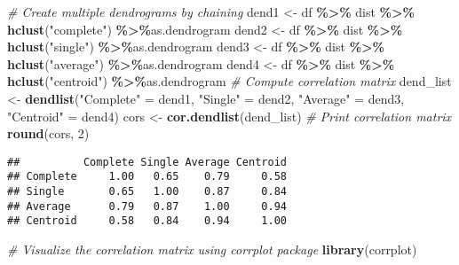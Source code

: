 \documentclass[
]{elegantbook}
\newenvironment{Shaded}{\begin{snugshade}}{\end{snugshade}}
\newcommand{\CommentTok}[1]{\textcolor[rgb]{0.56,0.35,0.01}{\textit{#1}}}
\newcommand{\DecValTok}[1]{\textcolor[rgb]{0.00,0.00,0.81}{#1}}
\newcommand{\FunctionTok}[1]{\textcolor[rgb]{0.13,0.29,0.53}{\textbf{#1}}}
\newcommand{\NormalTok}[1]{#1}
\newcommand{\OtherTok}[1]{\textcolor[rgb]{0.56,0.35,0.01}{#1}}
\newcommand{\SpecialCharTok}[1]{\textcolor[rgb]{0.81,0.36,0.00}{\textbf{#1}}}
\newcommand{\StringTok}[1]{\textcolor[rgb]{0.31,0.60,0.02}{#1}}
\begin{document}
\begin{Shaded}
\begin{Highlighting}[]
\CommentTok{\# Create multiple dendrograms by chaining}
\NormalTok{dend1 }\OtherTok{\textless{}{-}}\NormalTok{ df }\SpecialCharTok{\%\textgreater{}\%}\NormalTok{ dist }\SpecialCharTok{\%\textgreater{}\%} \FunctionTok{hclust}\NormalTok{(}\StringTok{"complete"}\NormalTok{) }\SpecialCharTok{\%\textgreater{}\%}\NormalTok{as.dendrogram}
\NormalTok{dend2 }\OtherTok{\textless{}{-}}\NormalTok{ df }\SpecialCharTok{\%\textgreater{}\%}\NormalTok{ dist }\SpecialCharTok{\%\textgreater{}\%} \FunctionTok{hclust}\NormalTok{(}\StringTok{"single"}\NormalTok{) }\SpecialCharTok{\%\textgreater{}\%}\NormalTok{as.dendrogram}
\NormalTok{dend3 }\OtherTok{\textless{}{-}}\NormalTok{ df }\SpecialCharTok{\%\textgreater{}\%}\NormalTok{ dist }\SpecialCharTok{\%\textgreater{}\%} \FunctionTok{hclust}\NormalTok{(}\StringTok{"average"}\NormalTok{) }\SpecialCharTok{\%\textgreater{}\%}\NormalTok{as.dendrogram}
\NormalTok{dend4 }\OtherTok{\textless{}{-}}\NormalTok{ df }\SpecialCharTok{\%\textgreater{}\%}\NormalTok{ dist }\SpecialCharTok{\%\textgreater{}\%} \FunctionTok{hclust}\NormalTok{(}\StringTok{"centroid"}\NormalTok{) }\SpecialCharTok{\%\textgreater{}\%}\NormalTok{as.dendrogram}
\CommentTok{\# Compute correlation matrix}
\NormalTok{dend\_list }\OtherTok{\textless{}{-}} \FunctionTok{dendlist}\NormalTok{(}\StringTok{"Complete"} \OtherTok{=}\NormalTok{ dend1, }\StringTok{"Single"} \OtherTok{=}\NormalTok{ dend2,}
\StringTok{"Average"} \OtherTok{=}\NormalTok{ dend3, }\StringTok{"Centroid"} \OtherTok{=}\NormalTok{ dend4)}
\NormalTok{cors }\OtherTok{\textless{}{-}} \FunctionTok{cor.dendlist}\NormalTok{(dend\_list)}
\CommentTok{\# Print correlation matrix}
\FunctionTok{round}\NormalTok{(cors, }\DecValTok{2}\NormalTok{)}
\end{Highlighting}
\end{Shaded}

\begin{verbatim}
##          Complete Single Average Centroid
## Complete     1.00   0.65    0.79     0.58
## Single       0.65   1.00    0.87     0.84
## Average      0.79   0.87    1.00     0.94
## Centroid     0.58   0.84    0.94     1.00
\end{verbatim}

\begin{Shaded}
\begin{Highlighting}[]
\CommentTok{\# Visualize the correlation matrix using corrplot package}
\FunctionTok{library}\NormalTok{(corrplot)}
\end{Highlighting}
\end{Shaded}
\end{document}
